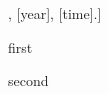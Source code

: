 
\begin{Sheet}[to be handed in until [month] [day], [year], [time].]

  \begin{Problem}
    first
  \end{Problem}

  \begin{Problem}
    second
  \end{Problem}
\end{Sheet}


